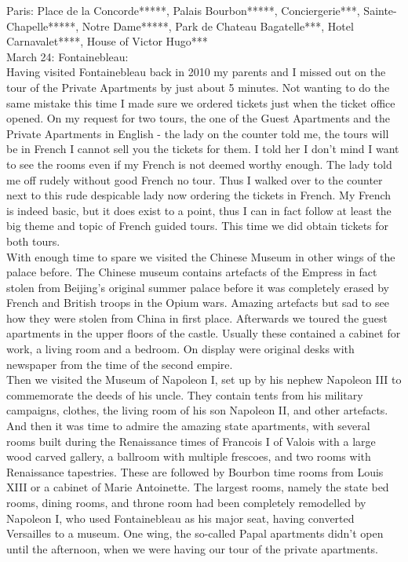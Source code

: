 Paris: Place de la Concorde*****, Palais Bourbon*****, Conciergerie***, Sainte-Chapelle*****, Notre Dame*****, Park de Chateau Bagatelle***, Hotel Carnavalet****, House of Victor Hugo***\\

March 24: Fontainebleau:\\
Having visited Fontainebleau back in 2010 my parents and I missed out on the tour of the Private Apartments by just about 5 minutes. Not wanting to do the same mistake this time I made sure we ordered tickets just when the ticket office opened. On my request for two tours, the one of the Guest Apartments and the Private Apartments in English - the lady on the counter told me, the tours will be in French I cannot sell you the tickets for them. I told her I don't mind I want to see the rooms even if my French is not deemed worthy enough. The lady told me off rudely without good French no tour. Thus I walked over to the counter next to this rude despicable lady now ordering the tickets in French. My French is indeed basic, but it does exist to a point, thus I can in fact follow at least the big theme and topic of French guided tours. This time we did obtain tickets for both tours. \\
With enough time to spare we visited the Chinese Museum in other wings of the palace before. The Chinese museum contains artefacts of the Empress in fact stolen from Beijing's original summer palace before it was completely erased by French and British troops in the Opium wars. Amazing artefacts but sad to see how they were stolen from China in first place. Afterwards we toured the guest apartments in the upper floors of the castle. Usually these contained a cabinet for work, a living room and a bedroom. On display were original desks with newspaper from the time of the second empire.\\
Then we visited the Museum of Napoleon I, set up by his nephew Napoleon III to commemorate the deeds of his uncle. They contain tents from his military campaigns, clothes, the living room of his son Napoleon II, and other artefacts. And then it was time to admire the amazing state apartments, with several rooms built during the Renaissance times of Francois I of Valois with a large wood carved gallery, a ballroom with multiple frescoes, and two rooms with Renaissance tapestries. These are followed by Bourbon time rooms from Louis XIII or a cabinet of Marie Antoinette. The largest rooms, namely the state bed rooms, dining rooms, and throne room had been completely remodelled by Napoleon I, who used Fontainebleau as his major seat, having converted Versailles to a museum. One wing, the so-called Papal apartments didn't open until the afternoon, when we were having our tour of the private apartments. \\
